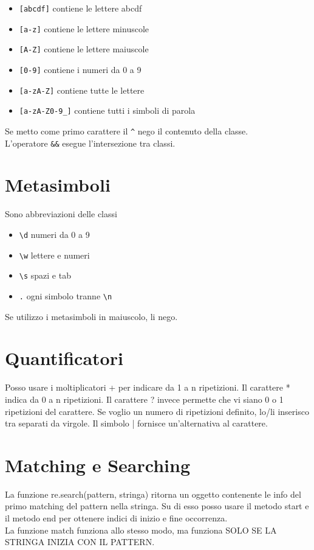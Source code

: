 \begin{itemize}
\item \verb|[abcdf]| contiene le lettere abcdf
\item \verb|[a-z]| contiene le lettere minuscole
\item \verb|[A-Z]| contiene le lettere maiuscole
\item \verb|[0-9]| contiene i numeri da 0 a 9
\item \verb|[a-zA-Z]| contiene tutte le lettere
\item \verb|[a-zA-Z0-9_]| contiene tutti i simboli di parola
\end{itemize}

Se metto come primo carattere il \verb|^| nego il contenuto della classe.\\
L'operatore \verb|&&| esegue l'intersezione tra classi.\\

\section{Metasimboli}
Sono abbreviazioni delle classi

\begin{itemize}
\item \verb|\d| numeri da 0 a 9
\item \verb|\w| lettere e numeri
\item \verb|\s| spazi e tab
\item \verb|.| ogni simbolo tranne \verb|\n|
\end{itemize}

Se utilizzo i metasimboli in maiuscolo, li nego.

\section{Quantificatori}
Posso usare i moltiplicatori + per indicare da 1 a n ripetizioni. Il carattere * indica da 0 a n ripetizioni. Il carattere ? invece permette che vi siano 0 o 1 ripetizioni del carattere. Se voglio un numero di ripetizioni definito, lo/li inserisco tra {} separati da virgole. Il simbolo | fornisce un'alternativa al carattere.

\section{Matching e Searching}
La funzione re.search(pattern, stringa) ritorna un oggetto contenente le info del primo matching del pattern nella stringa.
Su di esso posso usare il metodo start e il metodo end per ottenere indici di inizio e fine occorrenza.\\
La funzione match funziona allo stesso modo, ma funziona SOLO SE LA STRINGA INIZIA CON IL PATTERN.

